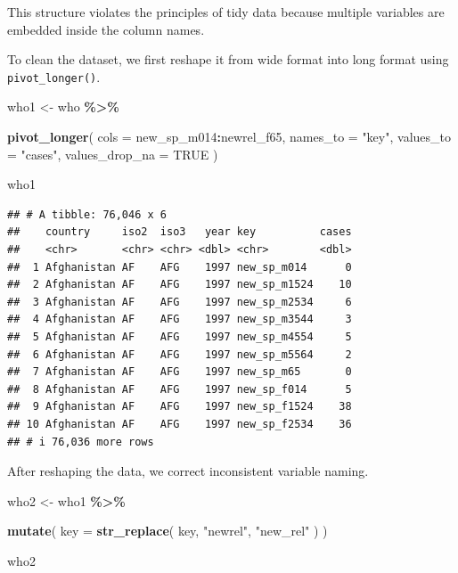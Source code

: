 \documentclass[
  11pt,
  oneside]{book}
\newenvironment{Shaded}{\begin{snugshade}}{\end{snugshade}}
\newcommand{\AttributeTok}[1]{\textcolor[rgb]{0.13,0.29,0.53}{#1}}
\newcommand{\ConstantTok}[1]{\textcolor[rgb]{0.56,0.35,0.01}{#1}}
\newcommand{\FunctionTok}[1]{\textcolor[rgb]{0.13,0.29,0.53}{\textbf{#1}}}
\newcommand{\NormalTok}[1]{#1}
\newcommand{\OtherTok}[1]{\textcolor[rgb]{0.56,0.35,0.01}{#1}}
\newcommand{\SpecialCharTok}[1]{\textcolor[rgb]{0.81,0.36,0.00}{\textbf{#1}}}
\newcommand{\StringTok}[1]{\textcolor[rgb]{0.31,0.60,0.02}{#1}}
\begin{document}
This structure violates the principles of tidy data because multiple variables are embedded inside the column names.

To clean the dataset, we first reshape it from wide format into long format using \texttt{pivot\_longer()}.

\begin{Shaded}
\begin{Highlighting}[]
\NormalTok{who1 }\OtherTok{\textless{}{-}}\NormalTok{ who }\SpecialCharTok{\%\textgreater{}\%}
  
  \FunctionTok{pivot\_longer}\NormalTok{(}
    \AttributeTok{cols =}\NormalTok{ new\_sp\_m014}\SpecialCharTok{:}\NormalTok{newrel\_f65,}
    \AttributeTok{names\_to =} \StringTok{"key"}\NormalTok{,}
    \AttributeTok{values\_to =} \StringTok{"cases"}\NormalTok{,}
    \AttributeTok{values\_drop\_na =} \ConstantTok{TRUE}
\NormalTok{  )}

\NormalTok{who1}
\end{Highlighting}
\end{Shaded}

\begin{verbatim}
## # A tibble: 76,046 x 6
##    country     iso2  iso3   year key          cases
##    <chr>       <chr> <chr> <dbl> <chr>        <dbl>
##  1 Afghanistan AF    AFG    1997 new_sp_m014      0
##  2 Afghanistan AF    AFG    1997 new_sp_m1524    10
##  3 Afghanistan AF    AFG    1997 new_sp_m2534     6
##  4 Afghanistan AF    AFG    1997 new_sp_m3544     3
##  5 Afghanistan AF    AFG    1997 new_sp_m4554     5
##  6 Afghanistan AF    AFG    1997 new_sp_m5564     2
##  7 Afghanistan AF    AFG    1997 new_sp_m65       0
##  8 Afghanistan AF    AFG    1997 new_sp_f014      5
##  9 Afghanistan AF    AFG    1997 new_sp_f1524    38
## 10 Afghanistan AF    AFG    1997 new_sp_f2534    36
## # i 76,036 more rows
\end{verbatim}

After reshaping the data, we correct inconsistent variable naming.

\begin{Shaded}
\begin{Highlighting}[]
\NormalTok{who2 }\OtherTok{\textless{}{-}}\NormalTok{ who1 }\SpecialCharTok{\%\textgreater{}\%}
  
  \FunctionTok{mutate}\NormalTok{(}
    \AttributeTok{key =} \FunctionTok{str\_replace}\NormalTok{(}
\NormalTok{      key,}
      \StringTok{"newrel"}\NormalTok{,}
      \StringTok{"new\_rel"}
\NormalTok{    )}
\NormalTok{  )}

\NormalTok{who2}
\end{Highlighting}
\end{Shaded}
\end{document}
